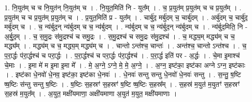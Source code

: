 \documentclass[17pt]{extarticle}
\begin{document}
1. नि॒युत॑म् च च नि॒युत॑न् नि॒युत॑म् च । . नि॒युत॒मिति॑ नि - युत᳚म् । . च॒ प्र॒युत॑म् प्र॒युत॑म् च च प्र॒युत᳚म् । . प्र॒युत॑म् च च प्र॒युत॑म् प्र॒युत॑म् च । . प्र॒युत॒मिति॑ प्र - युत᳚म् । . चार्बु॑द॒ मर्बु॑दम् च॒ चार्बु॑दम् । . अर्बु॑दम् च॒ चार्बु॑द॒ मर्बु॑दम् च । . च॒ न्य॑र्बुद॒न् न्य॑र्बुदम् च च॒ न्य॑र्बुदम् । . न्य॑र्बुदम् च च॒ न्य॑र्बुद॒न् न्य॑र्बुदम् च । . न्य॑र्बुद॒मिति॒ नि - अ॒र्बु॒द॒म् । . च॒ स॒मु॒द्रः स॑मु॒द्रश्च॑ च समु॒द्रः । . स॒मु॒द्रश्च॑ च समु॒द्रः स॑मु॒द्रश्च॑ । . च॒ मद्ध्य॒म् मद्ध्य॑म् च च॒ मद्ध्य᳚म् । . मद्ध्य॑म् च च॒ मद्ध्य॒म् मद्ध्य॑म् च । . चान्तो ऽन्त॑श्च॒ चान्तः॑ । . अन्त॑श्च॒ चान्तो ऽन्त॑श्च । . च॒ प॒रा॒र्द्धः प॑रा॒र्द्धश्च॑ च परा॒र्द्धः । . प॒रा॒र्द्धश्च॑ च परा॒र्द्धः प॑रा॒र्द्धश्च॑ । . प॒रा॒र्द्ध इति॑ पर - अ॒र्द्धः । . चे॒मा इ॒माश्च॑ चे॒माः । . इ॒मा मे॑ म इ॒मा इ॒मा मे᳚ । . मे॒ अ॒ग्ने॒ ऽग्ने॒ मे॒ मे॒ अ॒ग्ने॒ । . अ॒ग्न॒ इष्ट॑का॒ इष्ट॑का अग्ने ऽग्न॒ इष्ट॑काः । . इष्ट॑का धे॒नवो॑ धे॒नव॒ इष्ट॑का॒ इष्ट॑का धे॒नवः॑ । . धे॒नवः॑ सन्तु सन्तु धे॒नवो॑ धे॒नवः॑ सन्तु । . स॒न्तु॒ ष॒ष्टि ष्ष॒ष्टिः स॑न्तु सन्तु ष॒ष्टिः । . ष॒ष्टिः स॒हस्रꣳ॑ स॒हस्रꣳ॑ ष॒ष्टि ष्ष॒ष्टिः स॒हस्र᳚म् । . स॒हस्र॑ म॒युत॑ म॒युतꣳ॑ स॒हस्रꣳ॑ स॒हस्र॑ म॒युत᳚म् । . अ॒युत॒ मक्षी॑यमाणा॒ अक्षी॑यमाणा अ॒युत॑ म॒युत॒ मक्षी॑यमाणाः । \newline
\end{document}
